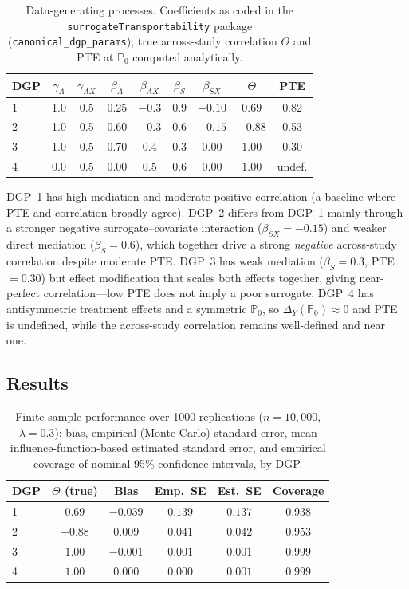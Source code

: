 \documentclass{article}
\newcommand{\PP}{\mathbb{P}}
\begin{document}
\begin{table}[h]
\centering
\caption{Data-generating processes. Coefficients as coded in the
\texttt{surrogateTransportability} package (\texttt{canonical\_dgp\_params}); true
across-study correlation $\Theta$ and PTE at $\PP_0$ computed analytically.}
\label{tab:dgps}
\begin{tabular}{lcccccccc}
\toprule
DGP & $\gamma_A$ & $\gamma_{AX}$ & $\beta_A$ & $\beta_{AX}$ & $\beta_S$ & $\beta_{SX}$ & $\Theta$ & PTE \\
\midrule
1 & 1.0 & 0.5 & 0.25 & $-0.3$ & 0.9 & $-0.10$ & $0.69$   & 0.82 \\
2 & 1.0 & 0.5 & 0.60 & $-0.3$ & 0.6 & $-0.15$ & $-0.88$  & 0.53 \\
3 & 1.0 & 0.5 & 0.70 & $0.4$  & 0.3 & $0.00$  & $1.00$   & 0.30 \\
4 & 0.0 & 0.5 & 0.00 & $0.5$  & 0.6 & $0.00$  & $1.00$   & undef. \\
\bottomrule
\end{tabular}
\end{table}

DGP~1 has high mediation and moderate positive correlation (a baseline where PTE
and correlation broadly agree). DGP~2 differs from DGP~1 mainly through a stronger
negative surrogate--covariate interaction ($\beta_{SX} = -0.15$) and weaker direct
mediation ($\beta_S = 0.6$), which together drive a strong \emph{negative}
across-study correlation despite moderate PTE. DGP~3 has weak mediation ($\beta_S = 0.3$, PTE
$=0.30$) but effect modification that scales both effects together, giving
near-perfect correlation---low PTE does not imply a poor surrogate. DGP~4 has
antisymmetric treatment effects and a symmetric $\PP_0$, so $\Delta_Y(\PP_0)
\approx 0$ and PTE is undefined, while the across-study correlation remains
well-defined and near one.

\subsection{Results}\label{sec:sim-results}

\begin{table}[h]
\centering
\caption{Finite-sample performance over 1000 replications ($n = 10{,}000$,
$\lambda = 0.3$): bias, empirical (Monte Carlo) standard error, mean
influence-function-based estimated standard error, and empirical coverage of
nominal 95\% confidence intervals, by DGP.}
\label{tab:performance}
\begin{tabular}{lccccc}
\toprule
DGP & $\Theta$ (true) & Bias & Emp.\ SE & Est.\ SE & Coverage \\
\midrule
1 & $0.69$  & $-0.039$ & $0.139$ & $0.137$ & $0.938$ \\
2 & $-0.88$ & $0.009$  & $0.041$ & $0.042$ & $0.953$ \\
3 & $1.00$  & $-0.001$ & $0.001$ & $0.001$ & $0.999$ \\
4 & $1.00$  & $0.000$  & $0.000$ & $0.001$ & $0.999$ \\
\bottomrule
\end{tabular}
\end{table}
\end{document}
